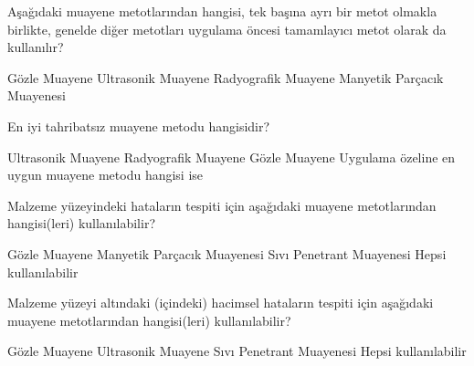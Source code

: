 \begin{question}[subtitle=]
	Aşağıdaki muayene metotlarından hangisi, tek başına ayrı bir metot olmakla birlikte, genelde diğer metotları uygulama öncesi   tamamlayıcı metot  olarak da kullanılır?
	
	\begin{tasks}
		\task Gözle Muayene \correct
		\task Ultrasonik Muayene 
		\task Radyografik Muayene
		\task Manyetik Parçacık Muayenesi
	\end{tasks}
\end{question}
\begin{solution}
	\correct
\end{solution}

\begin{question}[subtitle=]
	En iyi tahribatsız muayene metodu hangisidir?
	
	\begin{tasks}
		\task Ultrasonik Muayene
		\task Radyografik Muayene
		\task Gözle Muayene
		\task Uygulama özeline en uygun muayene metodu hangisi ise	\correct	
	\end{tasks}
\end{question}
\begin{solution}
	\correct
\end{solution}

\begin{question}[subtitle=]
	Malzeme yüzeyindeki hataların tespiti için aşağıdaki muayene metotlarından hangisi(leri) kullanılabilir?
	
	\begin{tasks}
		\task Gözle Muayene 
		\task Manyetik Parçacık Muayenesi
		\task Sıvı Penetrant Muayenesi
		\task Hepsi kullanılabilir	\correct
	\end{tasks}
\end{question}
\begin{solution}
	\correct
\end{solution}

\begin{question}[subtitle=]
	Malzeme yüzeyi altındaki (içindeki) hacimsel hataların tespiti için aşağıdaki muayene metotlarından hangisi(leri) kullanılabilir?
	
	\begin{tasks}
		\task Gözle Muayene 
		\task Ultrasonik Muayene \correct
		\task Sıvı Penetrant Muayenesi
		\task Hepsi kullanılabilir
	\end{tasks}
\end{question}
\begin{solution}
	\correct
\end{solution}

